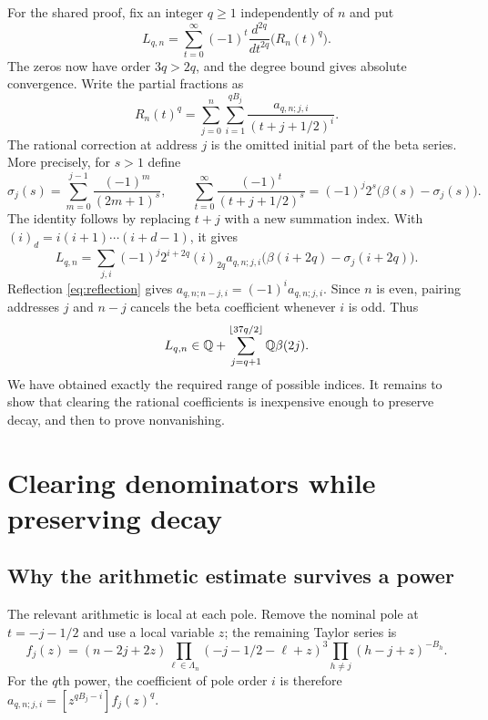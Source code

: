 \documentclass[11pt]{article}
\begin{document}
For the shared proof, fix an integer $q\ge1$ independently of $n$ and put
\begin{equation}\label{eq:L}
 L_{q,n}=\sum_{t=0}^{\infty}(-1)^t
                  \frac{d^{2q}}{dt^{2q}}\bigl(R_n(t)^q\bigr).
\end{equation}
The zeros now have order $3q>2q$, and the degree bound gives absolute
convergence. Write the partial fractions as
\[
 R_n(t)^q=\sum_{j=0}^n\sum_{i=1}^{qB_j}
                  \frac{a_{q,n;j,i}}{(t+j+1/2)^i}.
\]
The rational correction at address $j$ is the omitted initial part of
the beta series. More precisely, for $s>1$ define
\[
 \sigma_j(s)=\sum_{m=0}^{j-1}\frac{(-1)^m}{(2m+1)^s},
 \qquad
 \sum_{t=0}^{\infty}\frac{(-1)^t}{(t+j+1/2)^s}
       =(-1)^j2^s\bigl(\beta(s)-\sigma_j(s)\bigr).
\]
The identity follows by replacing $t+j$ with a new summation index.
With $(i)_d=i(i+1)\cdots(i+d-1)$, it gives
\begin{equation}\label{eq:expansion}
 L_{q,n}=\sum_{j,i}(-1)^j2^{i+2q}(i)_{2q}a_{q,n;j,i}
                 \bigl(\beta(i+2q)-\sigma_j(i+2q)\bigr).
\end{equation}
Reflection \eqref{eq:reflection} gives
$a_{q,n;n-j,i}=(-1)^ia_{q,n;j,i}$. Since $n$ is even, pairing addresses
$j$ and $n-j$ cancels the beta coefficient whenever $i$ is odd. Thus
\begin{equation}\label{eq:target}
 L_{q,n}\in\mathbb Q+\sum_{j=q+1}^{\lfloor37q/2\rfloor}\mathbb Q\beta(2j).
\end{equation}
We have obtained exactly the required range of possible indices. It
remains to show that clearing the rational coefficients is inexpensive
enough to preserve decay, and then to prove nonvanishing.

\section{Clearing denominators while preserving decay}\label{sec:bounds}
\subsection{Why the arithmetic estimate survives a power}
The relevant arithmetic is local at each pole. Remove the nominal pole
at $t=-j-1/2$ and use a local variable $z$; the remaining Taylor series is
\[
 f_j(z)=(n-2j+2z)\prod_{\ell\in\Lambda_n}(-j-1/2-\ell+z)^3
                   \prod_{h\ne j}(h-j+z)^{-B_h}.
\]
For the $q$th power, the coefficient of pole order $i$ is therefore
$a_{q,n;j,i}=[z^{qB_j-i}]f_j(z)^q$.
\end{document}
